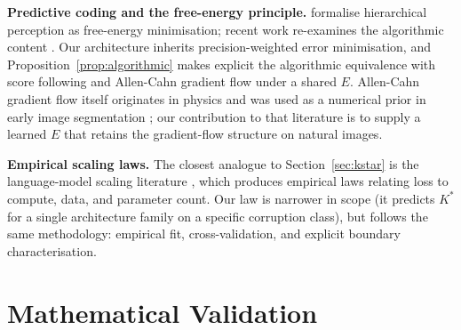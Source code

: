 \documentclass{article}
\begin{document}
\textbf{Predictive coding and the free-energy principle.}
\citet{rao1999predictive,friston2005free,bogacz2017tutorial}
formalise hierarchical perception as free-energy minimisation; recent work
re-examines the algorithmic content
\citep{millidge2022predictive,tschantz2023hybrid}. Our architecture inherits
precision-weighted error minimisation, and Proposition~\ref{prop:algorithmic}
makes explicit the algorithmic equivalence with score following and
Allen-Cahn gradient flow under a shared $E$. Allen-Cahn gradient flow
itself originates in physics
\citep{allen1979microscopic,fife1988dynamics} and was used as a numerical
prior in early image segmentation \citep{esedoglu2002threshold}; our
contribution to that literature is to supply a learned $E$ that retains the
gradient-flow structure on natural images.

\textbf{Empirical scaling laws.} The closest analogue to
Section~\ref{sec:kstar} is the language-model scaling literature
\citep{kaplan2020scaling,hoffmann2022chinchilla}, which produces empirical
laws relating loss to compute, data, and parameter count. Our law is
narrower in scope (it predicts $K^{*}$ for a single architecture family on
a specific corruption class), but follows the same methodology: empirical
fit, cross-validation, and explicit boundary characterisation.


\section{Mathematical Validation}
\label{app:math}
\end{document}
